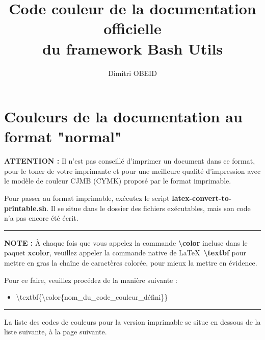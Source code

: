 \documentclass[a4paper,10pt]{article}
\title{\color{sec1}Code couleur de la documentation officielle \\du framework Bash Utils}\color{text}
\author{Dimitri OBEID}
\begin{document}
\maketitle

\color{sec1}
\section{Couleurs de la documentation au format "normal"}\color{text}

\begin{justify}
  \textbf{\color{case}ATTENTION :} Il n'est pas conseillé d'imprimer un document dans ce format, pour le toner de votre imprimante et pour une meilleure qualité d'impression avec le modèle de couleur CJMB (CYMK) proposé par le format imprimable.

  Pour passer au format imprimable, exécutez le script \textbf{\color{cmds}latex-convert-to-printable.sh}. Il se situe dans le dossier des fichiers exécutables, mais son code n'a pas encore été écrit.
\end{justify}

\color{text}\par\noindent\rule{\textwidth}{0.4pt}\color{text}

\begin{justify}
  \textbf{NOTE :} À chaque fois que vous appelez la commande \textbf{\textbackslash{color}} incluse dans le paquet \textbf{xcolor}, veuillez appeler la commande native de \LaTeX \ \textbf{\textbackslash{textbf}} pour mettre en gras la chaîne de caractères colorée, pour mieux la mettre en évidence.
\end{justify}

\begin{justify}
  Pour ce faire, veuillez procédez de la manière suivante :

  \begin{itemize}
    \item \textbackslash{textbf\{\textbackslash{color\{nom\_du\_code\_couleur\_défini}\}}\}
  \end{itemize}
\end{justify}

\color{text}\par\noindent\rule{\textwidth}{0.4pt}\color{text}

\begin{justify}
  La liste des codes de couleurs pour la version imprimable se situe en dessous de la liste suivante, à la page suivante.
\end{justify}
\end{document}
